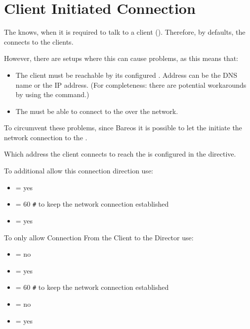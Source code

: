 \section{Client Initiated Connection}
\label{sec:ClientInitiatedConnection}

The \bareosDir knows, when it is required to talk to a client (\bareosFd).
Therefore, by defaults, the \bareosDir connects to the clients.

However, there are setups where this can cause problems, as this means that:
\begin{itemize}
    \item The client must be reachable by its configured . Address can be the DNS name or the IP address. (For completeness: there are potential workarounds by using the  command.)
    \item The \bareosDir must be able to connect to the \bareosFd over the network.
\end{itemize}

To circumvent these problems, since Bareos  it is possible to let the \bareosFd initiate the network connection to the \bareosDir.

Which address the client connects to reach the \bareosDir is configured in the  directive.

To additional allow this connection direction use:
\begin{itemize}
  \item {} = yes
  \item {} = 60 \verb|#| to keep the network connection established
  \item {} = yes
\end{itemize}

To only allow Connection From the Client to the Director use:
\begin{itemize}
  \item {} = no
  \item {} = yes
  \item {} = 60 \verb|#| to keep the network connection established
  \item {} = no
  \item {} = yes
\end{itemize}

